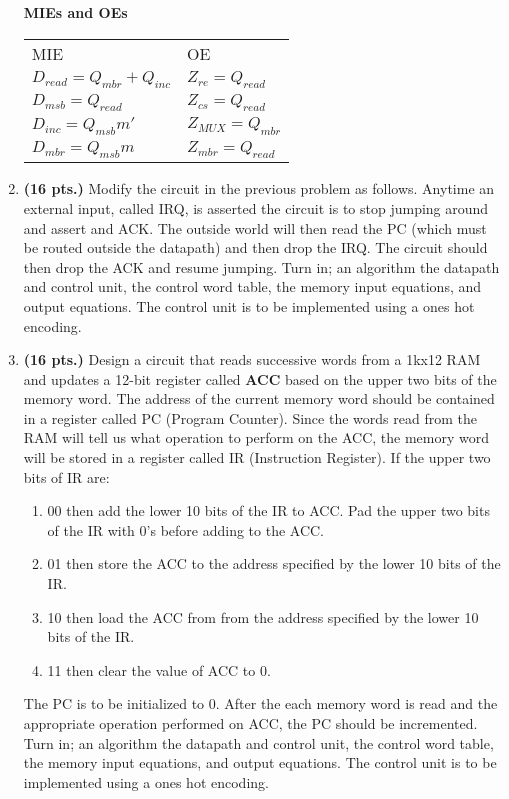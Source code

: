\begin{enumerate}
\begin{onlysolution}
{\textbf{ MIEs and OEs}

\begin{tabular}{ll}
MIE					&	OE			\\
$D_{read}= Q_{mbr}+Q_{inc}$		&  $Z_{re} = Q_{read}$		\\
$D_{msb} = Q_{read}$			&  $Z_{cs} = Q_{read}$		\\
$D_{inc}= Q_{msb} m'$			&  $Z_{MUX} = Q_{mbr}$		\\
$D_{mbr}= Q_{msb} m$			&  $Z_{mbr} = Q_{read}$		\\
\end{tabular}

} \end{onlysolution} 


\item \textbf{ (16 pts.)}
Modify the circuit in the previous problem as follows.  Anytime
an external input, called IRQ, is asserted the circuit is to stop
jumping around and assert and ACK.  The outside world will then read
the PC (which must be routed outside the datapath) and then drop the 
IRQ.  The circuit should then drop the ACK and resume jumping.
Turn in; an algorithm the datapath and control unit, the control word 
table, the memory input equations, and output equations.  
The control unit is to be implemented using a ones hot encoding.


\item  \textbf{ (16 pts.)} Design a circuit that reads successive words from 
a 1kx12 RAM and
updates a 12-bit register called \textbf{ ACC} based on the upper two bits of the 
memory word.  The address of the current memory word should be contained
in a register called PC (Program Counter).  Since the words read from the
RAM will tell us what operation to perform on the ACC, the memory word will
be stored in a register called IR (Instruction Register).  If the upper
two bits of IR are:
\begin{enumerate}
\item  00 then add the lower 10 bits of the IR to ACC.  Pad the upper two
	bits of the IR with 0's before adding to the ACC.
\item  01 then store the ACC to the address specified by the 
	lower 10 bits of the IR.
\item  10 then load the ACC from from the address specified by the lower 
	10 bits of the IR.
\item  11 then clear the value of ACC to 0.
\end{enumerate}

The PC is to be initialized to 0.  After the each memory word is read
and the appropriate operation performed on ACC, the PC should be
incremented.
Turn in; an algorithm the datapath and control unit, the control word 
table, the memory input equations, and output equations.  
The control unit is to be implemented using a ones hot encoding.



\end{enumerate}
